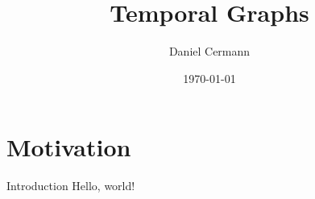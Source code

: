\documentclass{beamer}
\title{Temporal Graphs}
\date{\today}
\author{Daniel Cermann}
\institute{
  \hfill
  \begin{minipage}{0.3\textwidth}
    \begin{center}
      \texttt{[image: media/hpi\_logo.png]} \newline
      Hasso Plattner Institute 
    \end{center}
  \end{minipage}
}
\begin{document}
\maketitle

\section{Motivation}

\begin{frame}{Introduction}
  Hello, world!
\end{frame}
\end{document}
